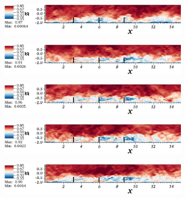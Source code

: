 \begin{figure}
\centering
        \begin{subfigure}[t]{0.85\textwidth}
                \includegraphics[width=\linewidth]{movie_xz_cropped/movie_xz_2.png}
                \caption{}
                \label{fig:snap1}
        \end{subfigure}
        \centering
        \begin{subfigure}[t]{0.85\textwidth}
                \includegraphics[width=\linewidth]{movie_xz_cropped/movie_xz_12.png}
                \caption{}
                \label{fig:snap2}
        \end{subfigure}
       \centering
        \begin{subfigure}[t]{0.85\textwidth}
                \includegraphics[width=\linewidth]{movie_xz_cropped/movie_xz_19.png}
                \caption{}
                \label{fig:snap3}
        \end{subfigure}
        \centering
        \begin{subfigure}[t]{0.85\textwidth}
                \includegraphics[width=\linewidth]{movie_xz_cropped/movie_xz_26.png}
                \caption{}
                \label{fig:snap4}
        \end{subfigure}
     \centering
        \begin{subfigure}[t]{0.85\textwidth}
                \includegraphics[width=\linewidth]{movie_xz_cropped/movie_xz_33.png}

\end{subfigure}
\end{figure}
